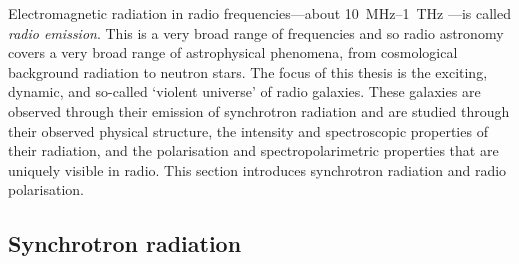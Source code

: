 \documentclass[11pt, a4paper]{book}
\newcommand{\defn}[1]{\emph{#1}}
\begin{document}
    Electromagnetic radiation in radio frequencies---about 10~MHz--1~THz \citep{condon_essential_2016}---is called \defn{radio emission}. This is a very broad range of frequencies and so radio astronomy covers a very broad range of astrophysical phenomena, from cosmological background radiation to neutron stars. The focus of this thesis is the exciting, dynamic, and so-called `violent universe' of radio galaxies. These galaxies are observed through their emission of synchrotron radiation and are studied through their observed physical structure, the intensity and spectroscopic properties of their radiation, and the polarisation and spectropolarimetric properties that are uniquely visible in radio. This section introduces synchrotron radiation and radio polarisation.

    \subsection{Synchrotron radiation}
    \label{sec:synchrotron}
\end{document}

